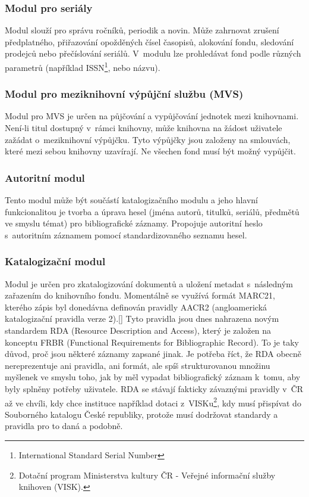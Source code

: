 \documentclass[
	11pt, oneside, printed, draft, 
	table,   %
	lof,     %
	lot     %
]{fithesis3}
\newcommand{\citepages}[2]{[\cite[#1]{#2}]}
\begin{document}
{\subsubsection{Modul pro seriály}
Modul slouží pro správu ročníků, periodik a novin. Může zahrnovat zrušení předplatného, přiřazování opožděných čísel časopisů, alokování fondu, sledování prodejců nebo přečíslování seriálů. V~modulu lze prohledávat fond podle různých parametrů (například ISSN\footnote{International Standard Serial Number}, nebo názvu).

\subsubsection{Modul pro meziknihovní výpůjční službu (MVS)}
Modul pro MVS je určen na půjčování a vypůjčování jednotek mezi knihovnami. Není-li titul dostupný v~rámci knihovny, může knihovna na žádost uživatele zažádat o~meziknihovní výpůjčku. Tyto výpůjčky jsou založeny na smlouvách, které mezi sebou knihovny uzavírají. Ne všechen fond musí být možný vypůjčit.

\subsubsection{Autoritní modul}
Tento modul může být součástí katalogizačního modulu a jeho hlavní funkcionalitou je tvorba a úprava hesel (jména autorů, titulků, seriálů, předmětů ve smyslu témat) pro bibliografické záznamy. Propojuje autoritní heslo s~autoritním záznamem pomocí standardizovaného seznamu hesel.

\subsubsection{Katalogizační modul}
Modul je určen pro zkatalogizování dokumentů a uložení metadat s~následným zařazením do knihovního fondu. Momentálně se využívá formát MARC21, kterého zápis byl donedávna definován pravidly AACR2 (angloamerická katalogizační pravidla verze 2).\citepages{26-27}{dilhofova_kratochvilova_lidmila_2013} Tyto pravidla jsou dnes nahrazena novým standardem RDA (Resource Description and Access), který je založen na konceptu FRBR (Functional Requirements for Bibliographic Record). To je taky důvod, proč jsou některé záznamy zapsané jinak. Je potřeba říct, že RDA obecně nereprezentuje ani pravidla, ani formát, ale spíš strukturovanou množinu myšlenek ve smyslu toho, jak by měl vypadat bibliografický záznam k~tomu, aby byly splněny potřeby uživatele.
RDA se stávají fakticky závaznými pravidly v~ČR až ve chvíli, kdy chce instituce například dotaci z~VISKu\footnote{Dotační program Ministerstva kultury ČR - Veřejné informační služby knihoven (VISK).}, kdy musí přispívat do Souborného katalogu České republiky, protože musí dodržovat standardy a pravidla pro to daná a podobně.

}
\end{document}
